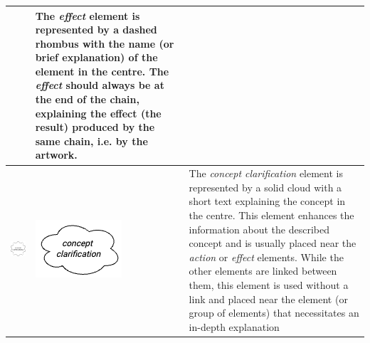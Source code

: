 \begin{longtable}{|m{}|m{}|m{}|}
    & 
    The \textit{effect} element is represented by a dashed rhombus with the name (or brief explanation) of the element in the centre. The \textit{effect} should always be at the end of the chain, explaining the effect (the result) produced by the same chain, i.e. by the artwork.
    \\\hline
    \centering
    \includegraphics[width=0.75\linewidth]{chapters/4-MDC_model_application/image/bvl-concept-o.png}
    &
    \centering
    \includegraphics[width=0.75\linewidth]{chapters/4-MDC_model_application/image/bvl-concept.png}
    & 
    The \textit{concept clarification} element is represented by a solid cloud with a short text explaining the concept in the centre. This element enhances the information about the described concept and is usually placed near the \textit{action} or \textit{effect} elements. While the other elements are linked between them, this element is used without a link and placed near the element (or group of elements) that necessitates an in-depth explanation
    \\\hline
\end{longtable}

